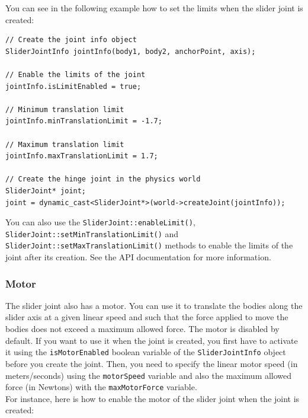 \documentclass[a4paper,12pt]{article}
\begin{document}
    You can see in the following example how to set the limits when the slider joint is created: \\

    \begin{lstlisting}
// Create the joint info object
SliderJointInfo jointInfo(body1, body2, anchorPoint, axis);

// Enable the limits of the joint
jointInfo.isLimitEnabled = true;

// Minimum translation limit
jointInfo.minTranslationLimit = -1.7;

// Maximum translation limit
jointInfo.maxTranslationLimit = 1.7;

// Create the hinge joint in the physics world
SliderJoint* joint;
joint = dynamic_cast<SliderJoint*>(world->createJoint(jointInfo));
  \end{lstlisting}

    \vspace{0.6cm}

   \begin{sloppypar}
     You can also use the \texttt{SliderJoint::enableLimit()}, \texttt{SliderJoint::\-setMinTranslationLimit()} and \texttt{SliderJoint::setMaxTranslationLimit()} methods to
     enable the limits of the joint after its creation. See the API documentation for more information.
    \end{sloppypar}

    \subsubsection{Motor}

     The slider joint also has a motor. You can use it to translate the bodies along the slider axis at a given linear speed and such that the force applied to
     move the bodies does not exceed a maximum allowed force. The motor is disabled by default. If you want to use it when the joint is created, you first have to activate it using the
     \texttt{isMotorEnabled} boolean variable of the \texttt{SliderJointInfo} object before you create the joint. Then, you need to specify the linear motor speed (in meters/seconds)
     using the \texttt{motorSpeed} variable and also the maximum allowed force (in Newtons) with the \texttt{maxMotorForce} variable. \\

     For instance, here is how to enable the motor of the slider joint when the joint is created: \\
\end{document}
